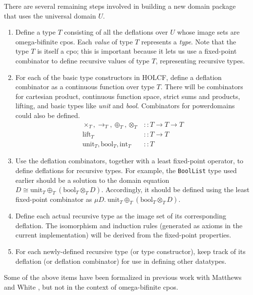 \documentclass{llncs}
\begin{document}
There are several remaining steps involved in building a new domain
package that uses the universal domain $U$.
\begin{enumerate}
\item Define a type $T$ consisting of all the deflations over $U$
  whose image sets are omega-bifinite cpos.  Each \emph{value} of type
  $T$ represents a \emph{type}.  Note that the type $T$ is itself a
  cpo; this is important because it lets us use a fixed-point
  combinator to define recursive values of type $T$, representing
  recursive types.

\item For each of the basic type constructors in HOLCF, define a
  deflation combinator as a continuous function over type $T$.  There
  will be combinators for cartesian product, continuous function
  space, strict sums and products, lifting, and basic types like
  \emph{unit} and \emph{bool}.  Combinators for powerdomains could
  also be defined.
  \begin{align*}
  \times_T, \rightarrow_T, \oplus_T, \otimes_T
    & :: T \rightarrow T \rightarrow T \\
  \mbox{lift}_T & :: T \rightarrow T \\
  \mbox{unit}_T, \mbox{bool}_T, \mbox{int}_T & :: T
  \end{align*}

\item Use the deflation combinators, together with a least fixed-point
  operator, to define deflations for recursive types.  For example,
  the \texttt{BoolList} type used earlier should be a solution to the
  domain equation $D \cong \mbox{unit}_T \oplus_T (\mbox{bool}_T
  \otimes_T D)$.  Accordingly, it should be defined using the least
  fixed-point combinator as $\mu D.\ \mbox{unit}_T \oplus_T
  (\mbox{bool}_T \otimes_T D)$.

\item Define each actual recursive type as the image set of its
  corresponding deflation.  The isomorphism and induction rules
  (generated as axioms in the current implementation) will be derived
  from the fixed-point properties.

\item For each newly-defined recursive type (or type constructor),
  keep track of its deflation (or deflation combinator) for use in
  defining other datatypes.

\end{enumerate}

Some of the above items have been formalized in previous work with
Matthews and White \cite{huffman05axiomatic}, but not in the context
of omega-bifinite cpos.
\end{document}
